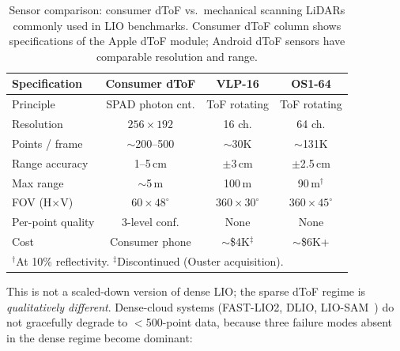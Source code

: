\begin{table}[t]
    \centering
    \caption{Sensor comparison: consumer dToF vs.\ mechanical scanning
    LiDARs commonly used in LIO benchmarks.
    Consumer dToF column shows specifications of the Apple dToF module;
    Android dToF sensors have comparable resolution and range.}
    \label{tab:sensor_comparison}
    \setlength{\tabcolsep}{3.5pt}
    \begin{tabular}{lccc}
        \toprule
        Specification    & Consumer dToF    & VLP-16           & OS1-64           \\
        \midrule
        Principle        & SPAD photon cnt. & ToF rotating     & ToF rotating     \\
        Resolution       & $256 \times 192$ & 16 ch.           & 64 ch.           \\
        Points / frame   & ${\sim}$200--500 & ${\sim}$30K      & ${\sim}$131K     \\
        Range accuracy   & 1--5\,cm         & $\pm$3\,cm       & $\pm$2.5\,cm     \\
        Max range        & ${\sim}$5\,m     & 100\,m           & 90\,m$^\dagger$  \\
        FOV (H$\times$V) & $60\times48^{\circ}$ & $360\times30^{\circ}$ & $360\times45^{\circ}$ \\
        Per-point quality & 3-level conf.   & None             & None             \\
        Cost             & Consumer phone   & ${\sim}$\$4K$^\ddagger$ & ${\sim}$\$6K+ \\
        \bottomrule
        \multicolumn{4}{l}{\scriptsize $^\dagger$At 10\% reflectivity.
                           $^\ddagger$Discontinued (Ouster acquisition).}
    \end{tabular}
\end{table}

This is not a scaled-down version of dense LIO; the sparse dToF regime
is \emph{qualitatively different}.
Dense-cloud systems (FAST-LIO2, DLIO, LIO-SAM~\cite{shan2020liosam})
do not gracefully degrade to $<$500-point data,
because three failure modes absent in the dense regime become dominant:

